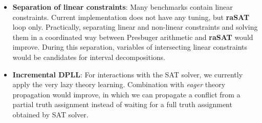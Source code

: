 \documentclass[runningheads,a4paper,oribibl]{llncs}
\newcommand{\suppress}[1]{} %
\begin{document}
{\begin{itemize}
\item \textbf{Separation of linear constraints}: 
Many benchmarks contain linear constraints. Current implementation does not have 
any tuning, but {\bf raSAT} loop only. 
Practically, separating linear and non-linear constraints and solving them 
in a coordinated way between Presbuger arithmetic and {\bf raSAT} would improve. 
During this separation, variables of intersecting linear constraints would be candidates 
for interval decompositions. 

\item \textbf{Incremental DPLL}: For interactions with the SAT solver, 
we currently apply the very lazy theory learning. Combination with 
\emph{eager} theory propagation would improve, in which we can propagate 
a conflict from a partial truth assignment instead of waiting 
for a full truth assignment obtained by SAT solver.
\end{itemize}
}

\suppress{
\subsection{Applications}
\begin{itemize}
\item \textbf{Checking overflow and roundoff error}: In the computers, the real numbers are represented by finite numbers (i.e., floating point numbers, fixed point numbers). Due to finite representation, the over-flow and roundoff errors (OREs) \cite{ngocsefm, ngocase} may occur. The OREs will be propagated through computations of the program. Further, the computations themselves also cause OREs because the arithmetic needs to round the result to fit the number format. Besides, OREs are also affected by types of statements, i.e., branch, loop, assignment statements.
By symbolic execution, ORE constraints are propagated from a program and ORE problems are reduced to problems of solving ORE constraints for verifying whether OREs occur. 

\item \textbf{Loop invariant generation}: The problem of linear invariant generation is often reduced to the problem of non-linear constraint solving. 
Since Farkas's Lemma \cite{Colon03} uses the product of matrices with polynomial constraint solving, we can extend the target for non-linear invariant generation.
\end{itemize}
}
\end{document}
